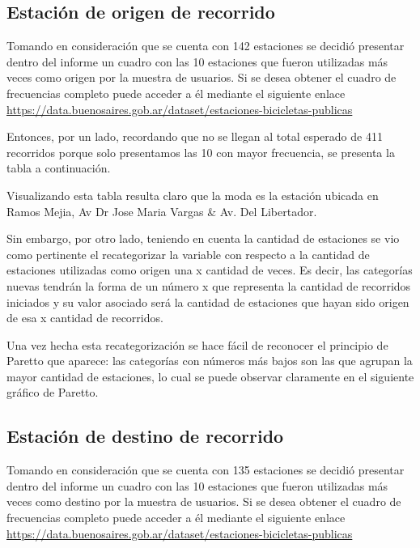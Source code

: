 \documentclass[11pt]{article}
\begin{document}
    \subsection{Estaci\'on de origen de recorrido}

    Tomando en consideraci\'on que se cuenta con 142 estaciones se decidi\'o presentar dentro del informe un cuadro con las 10 estaciones que fueron utilizadas m\'as veces como origen por la muestra de usuarios. 
    Si se desea obtener el cuadro de frecuencias completo puede acceder a \'el mediante el siguiente enlace {\small \url{https://data.buenosaires.gob.ar/dataset/estaciones-bicicletas-publicas}}

    Entonces, por un lado, recordando que no se llegan al total esperado de 411 recorridos porque solo presentamos las 10 con mayor frecuencia, se presenta la tabla a continuaci\'on. 




    Visualizando esta tabla resulta claro que la moda es la estaci\'on ubicada en Ramos Mejia, Av Dr Jose Maria Vargas \& Av. Del Libertador. 

    Sin embargo, por otro lado, teniendo en cuenta la cantidad de estaciones se vio como pertinente el recategorizar la variable 
    con respecto a la cantidad de estaciones utilizadas como origen una x cantidad de veces. Es decir, 
    las categor\'ias nuevas tendr\'an la forma de un n\'umero x que representa la cantidad de recorridos iniciados y su valor
    asociado ser\'a la cantidad de estaciones que hayan sido origen de esa x cantidad de recorridos. 

    Una vez hecha esta recategorizaci\'on se hace f\'acil de reconocer el principio de Paretto que aparece: las categor\'ias con n\'umeros m\'as bajos son las que 
    agrupan la mayor cantidad de estaciones, lo cual se puede observar claramente en el siguiente gr\'afico de Paretto. 




    \subsection{Estaci\'on de destino de recorrido}

    Tomando en consideraci\'on que se cuenta con 135 estaciones se decidi\'o presentar dentro del informe un cuadro con las 10 estaciones que fueron utilizadas m\'as veces como destino por la muestra de usuarios. 
    Si se desea obtener el cuadro de frecuencias completo puede acceder a \'el mediante el siguiente enlace {\small \url{https://data.buenosaires.gob.ar/dataset/estaciones-bicicletas-publicas}}
\end{document}
